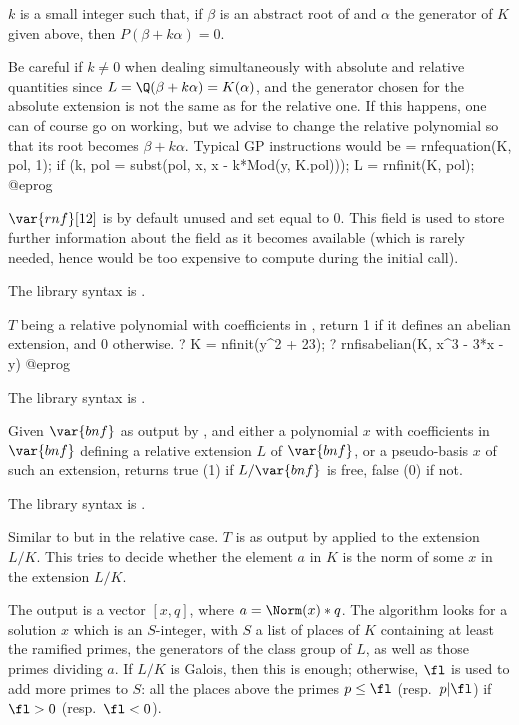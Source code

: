$k$ is a small integer such that, if $\beta$ is an abstract root of 
and $\alpha$ the generator of $K$ given above, then $P(\beta + k\alpha) = 0$.

 Be careful if $k\neq0$ when dealing simultaneously with
absolute and relative quantities since $L = \Q(\beta + k\alpha) =
K(\alpha)$, and the generator chosen for the absolute extension is not the
same as for the relative one. If this happens, one can of course go on
working, but we advise to change the relative polynomial so that its root
becomes $\beta + k \alpha$. Typical GP instructions would be
\bprog
  [P,a,k] = rnfequation(K, pol, 1);
  if (k, pol = subst(pol, x, x - k*Mod(y, K.pol)));
  L = rnfinit(K, pol);
@eprog

$\var{rnf}[12]$ is by default unused and set equal to 0. This field is used
to store further information about the field as it becomes available (which
is rarely needed, hence would be too expensive to compute during the initial
 call).

The library syntax is .

\label{se:rnfisabelian}
$T$ being a relative polynomial with coefficients
in , return 1 if it defines an abelian extension, and 0 otherwise.
\bprog
? K = nfinit(y^2 + 23);
? rnfisabelian(K, x^3 - 3*x - y)
@eprog

The library syntax is .

\label{se:rnfisfree}
Given $\var{bnf}$ as output by
, and either a polynomial $x$ with coefficients in $\var{bnf}$
defining a relative extension $L$ of $\var{bnf}$, or a pseudo-basis $x$ of
such an extension, returns true (1) if $L/\var{bnf}$ is free, false (0) if
not.

The library syntax is .

\label{se:rnfisnorm}
Similar to
 but in the relative case. $T$ is as output by
 applied to the extension $L/K$. This tries to decide
whether the element $a$ in $K$ is the norm of some $x$ in the extension
$L/K$.

The output is a vector $[x,q]$, where $a = \Norm(x)*q$. The
algorithm looks for a solution $x$ which is an $S$-integer, with $S$ a list
of places of $K$ containing at least the ramified primes, the generators of
the class group of $L$, as well as those primes dividing $a$. If $L/K$ is
Galois, then this is enough; otherwise, $\fl$ is used to add more primes to
$S$: all the places above the primes $p \leq \fl$ (resp.~$p|\fl$) if $\fl>0$
(resp.~$\fl<0$).

